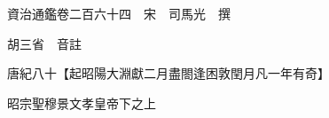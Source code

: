 










 


 
 


 

  
  
  
  
  





  
  
  
  
  
 
  

  

  
  
  



  

 
 

  
   




  

  
  


  　　資治通鑑卷二百六十四　宋　司馬光　撰

　　胡三省　音註

　　唐紀八十【起昭陽大淵獻二月盡閤逢困敦閏月凡一年有奇】

　　昭宗聖穆景文孝皇帝下之上

